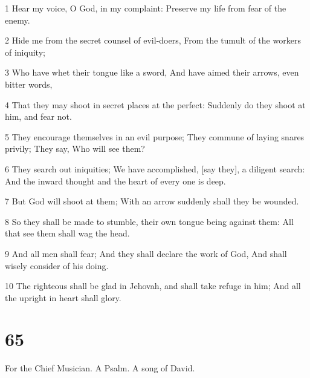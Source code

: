 \par 1 Hear my voice, O God, in my complaint: Preserve my life from fear of the enemy.
\par 2 Hide me from the secret counsel of evil-doers, From the tumult of the workers of iniquity;
\par 3 Who have whet their tongue like a sword, And have aimed their arrows, even bitter words,
\par 4 That they may shoot in secret places at the perfect: Suddenly do they shoot at him, and fear not.
\par 5 They encourage themselves in an evil purpose; They commune of laying snares privily; They say, Who will see them?
\par 6 They search out iniquities; We have accomplished, [say they], a diligent search: And the inward thought and the heart of every one is deep.
\par 7 But God will shoot at them; With an arrow suddenly shall they be wounded.
\par 8 So they shall be made to stumble, their own tongue being against them: All that see them shall wag the head.
\par 9 And all men shall fear; And they shall declare the work of God, And shall wisely consider of his doing.
\par 10 The righteous shall be glad in Jehovah, and shall take refuge in him; And all the upright in heart shall glory.

\chapter{65}

\par For the Chief Musician. A Psalm. A song of David.

